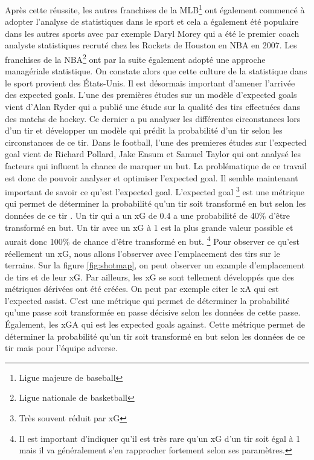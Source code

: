 \documentclass[12pt]{article}
\begin{document}
\newline
Après cette réussite, les autres franchises de la MLB\footnote{Ligue majeure de baseball} ont également commencé à adopter l'analyse de statistiques dans le sport et cela a également été populaire dans les autres sports avec par exemple Daryl Morey qui a été le premier coach analyste statistiques recruté chez les Rockets de Houston en NBA en 2007. \cite{DarylMorey13year2020}
Les franchises de la NBA\footnote{Ligue nationale de basketball} ont par la suite également adopté une approche managériale statistique.
On constate alors que cette culture de la statistique dans le sport provient des États-Unis.
\newline
Il est désormais important d'amener l'arrivée des expected goals. L'une des premières études sur un modèle d'expected goals vient d'Alan Ryder qui a publié une étude sur la qualité des tirs effectuées dans des matchs de hockey. \cite{ryderIsolatingShotQuality2004}
Ce dernier a pu analyser les différentes circonstances lors d'un tir et développer un modèle qui prédit la probabilité d'un tir selon les circonstances de ce tir.
Dans le football, l'une des premieres études sur l'expected goal vient de Richard Pollard, Jake Ensum et Samuel Taylor qui ont analysé les facteurs qui influent la chance de marquer un but. \cite{pollardEstimatingProbabilityShot2004} La problématique de ce travail est donc de pouvoir analyser et optimiser l'expected goal.
\newline\newline
Il semble maintenant important de savoir ce qu'est l'expected goal. L'expected goal
\footnote{Très souvent réduit par xG} est une métrique qui permet de déterminer la probabilité qu'un tir soit transformé en but selon les données de ce tir \cite{XGExplainedFBrefa}.
Un tir qui a un xG de 0.4 a une probabilité de 40\% d'être transformé en but. Un tir avec un xG à 1 est la plus grande valeur possible et aurait donc 100\% de chance d'être transformé en but.
\footnote{Il est important d'indiquer qu'il est très rare qu'un xG d'un tir soit égal à 1 mais il va généralement s'en rapprocher fortement selon ses paramètres.} \cite{pettyWhatExpectedGoals2018a}
\newline\newline
Pour observer ce qu'est réellement un xG, nous allons l'observer avec l'emplacement des tirs sur le terrains.
Sur la figure \ref{fig:shotmap}, on peut observer un example d'emplacement de tirs et de leur xG.
\newline \newline
\noindent Par ailleurs, les xG se sont tellement développés que des métriques dérivées ont été créées. On peut par exemple citer le xA qui est l'expected assist. C'est une métrique qui permet de déterminer la probabilité qu'une passe soit transformée en passe décisive selon les données de cette passe. \cite{XGExplainedFBrefa}
Également, les xGA qui est les expected goals against. Cette métrique permet de déterminer la probabilité qu'un tir soit transformé en but selon les données de ce tir mais pour l'équipe adverse. \cite{pettyWhatExpectedGoals2018a}
\end{document}
